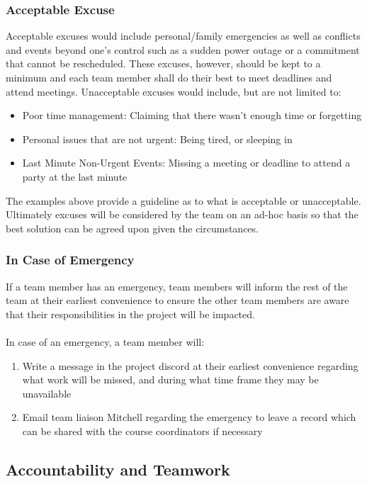 \documentclass{article}
\begin{document}
\subsubsection*{Acceptable Excuse}

Acceptable excuses would include personal/family emergencies as well as conflicts and events beyond one’s
control such as a sudden power outage or a commitment that cannot be rescheduled. These excuses,
however, should be kept to a minimum and each team member shall do their best to meet deadlines and
attend meetings. Unacceptable excuses would include, but are not limited to:\\
\begin{itemize}
\item Poor time management: Claiming that there wasn’t enough time or forgetting
\item Personal issues that are not urgent: Being tired, or sleeping in
\item Last Minute Non-Urgent Events: Missing a meeting or deadline to attend a party at the last minute
\end{itemize}
The examples above provide a guideline as to what is acceptable or unacceptable. Ultimately excuses will be
considered by the team on an ad-hoc basis so that the best solution can be agreed upon given the
circumstances.

\subsubsection*{In Case of Emergency}

If a team member has an emergency, team members will inform the rest of the team at their earliest
convenience to ensure the other team members are aware that their responsibilities in the project will be
impacted.\\
\\
In case of an emergency, a team member will:
\begin{enumerate}
  \item Write a message in the project discord at their earliest convenience regarding what work will be missed,
  and during what time frame they may be unavailable
  \item Email team liaison Mitchell regarding the emergency to leave a record which can be shared with the
  course coordinators if necessary
\end{enumerate}

\subsection*{Accountability and Teamwork}
\end{document}
